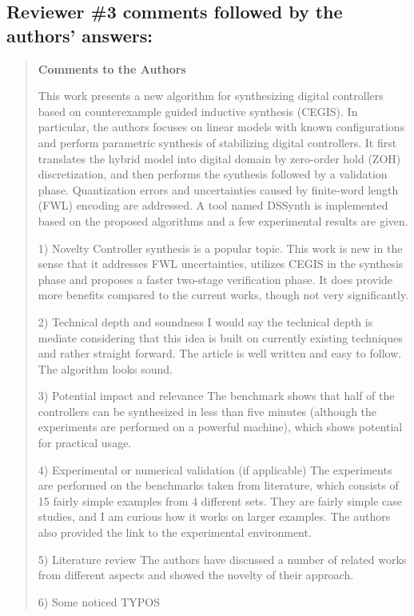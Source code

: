 \documentclass[11pt]{article}
\begin{document}
\subsection*{Reviewer \#3 comments followed by the authors' answers:}
\begin{quote}

{\bf Comments to the Authors}

This work presents a new algorithm for synthesizing digital controllers based on counterexample guided inductive synthesis (CEGIS). In particular, the authors focuses on linear models with known configurations and perform parametric synthesis of stabilizing digital controllers. It first translates the hybrid model into digital domain by zero-order hold (ZOH) discretization, and then performs the synthesis followed by a validation phase. Quantization errors and uncertainties caused by finite-word length (FWL) encoding are addressed. A tool named DSSynth is implemented based on the proposed algorithms and a few experimental results are given.

1) Novelty
Controller synthesis is a popular topic. This work is new in the sense that it addresses FWL uncertainties, utilizes CEGIS in the synthesis phase and proposes a faster two-stage verification phase. It does provide more benefits compared to the current works, though not very significantly.

2) Technical depth and soundness 
I would say the technical depth is mediate considering that this idea is built on currently existing techniques and rather straight forward. The article is well written and easy to follow. The algorithm looks sound. 

3) Potential impact and relevance
The benchmark shows that half of the controllers can be synthesized in less than five minutes (although the experiments are performed on a powerful machine), which shows potential for practical usage.

4) Experimental or numerical validation (if applicable) 
The experiments are performed on the benchmarks taken from literature, which consists of 15 fairly simple examples from 4 different sets. They are fairly simple case studies, and I am curious how it works on larger examples. The authors also provided the link to the experimental environment.

5) Literature review
The authors have discussed a number of related works from different aspects and showed the novelty of their approach.

6) Some noticed TYPOS


\end{quote}
\end{document}
